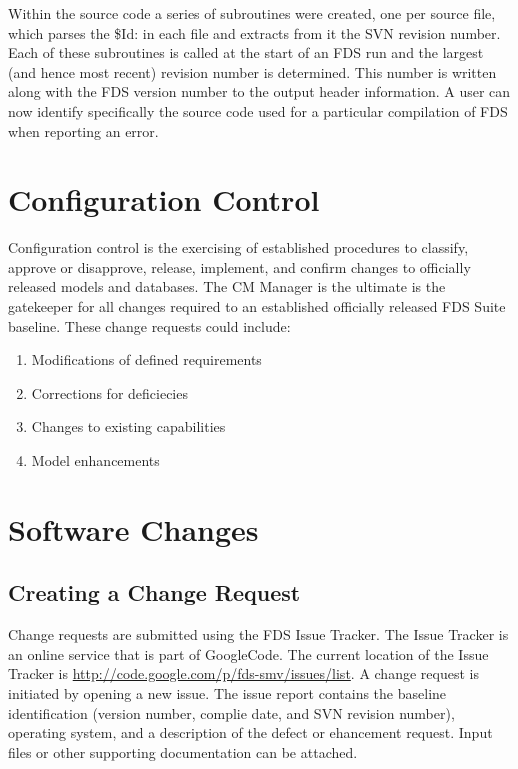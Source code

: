 \documentclass[11pt]{book}
\begin{document}
Within the source code a series of subroutines were created, one per source file, which parses the {\ct \$Id:} in
each file and extracts from it the SVN revision number.  Each of these subroutines is called at the start
of an FDS run and the largest (and hence most recent) revision number is determined.  This number is written
along with the FDS version number to the output header information.  A user can now identify specifically
the source code used for a particular compilation of FDS when reporting an error.

\section{Configuration Control}

Configuration control is the exercising of established procedures to classify, approve or disapprove, release,
implement, and confirm changes to officially released models and databases.  The CM Manager is the
ultimate is the gatekeeper for all changes required to an established officially released FDS Suite baseline.
These change requests could include:

\begin{enumerate}

\item Modifications of defined requirements

\item Corrections for deficiecies

\item Changes to existing capabilities 

\item Model enhancements

\end{enumerate}

\section{Software Changes}

\subsection{Creating a Change Request}

Change requests are submitted using the FDS Issue Tracker.  The Issue Tracker is an online service that is part of
GoogleCode.  The current location of the Issue Tracker is \href{http://code.google.com/p/fds-smv/issues/list}
{{\ct http://code.google.com/p/fds-smv/issues/list}}.  A change request is initiated by opening a new issue.
The issue report contains the baseline identification (version number, complie date, and SVN revision number),
operating system, and a description of the defect or ehancement request.  Input files or other supporting 
documentation can be attached.
\end{document}
